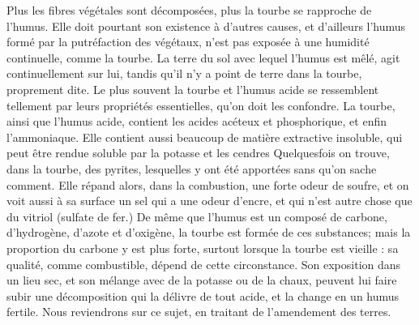Plus les fibres végétales sont décomposées, plus la tourbe se rapproche de l'humus. Elle doit pourtant son existence à d'autres causes,\setcounter{page}{75} et d'ailleurs l'humus formé par la putréfaction des végétaux, n'est pas exposée à une humidité continuelle, comme la tourbe. La terre du sol avec lequel l'humus est mêlé, agit continuellement sur lui, tandis qu'il n'y a point de terre dans la tourbe, proprement dite. Le plus souvent la tourbe et l'humus acide se ressemblent tellement par leurs propriétés essentielles, qu'on doit les confondre.
La tourbe, ainsi que l'humus acide, contient les acides acéteux et phosphorique, et enfin l'ammoniaque. Elle contient aussi beaucoup de matière extractive insoluble, qui peut être rendue soluble par la potasse et les cendres Quelquesfois on trouve, dans la tourbe, des pyrites, lesquelles y ont été apportées sans qu'on sache comment. Elle répand alors, dans la combustion, une forte odeur de soufre, et on voit aussi à sa surface un sel qui a une odeur d'encre, et qui n'est autre chose que du vitriol (sulfate de fer.)
De même que l'humus est un composé de carbone, d'hydrogène, d'azote et d'oxigène, la tourbe est formée de ces substances; mais la proportion du carbone y est plus forte, surtout lorsque la tourbe est vieille : sa qualité,\setcounter{page}{76} comme combustible, dépend de cette circonstance. Son exposition dans un lieu sec, et son mélange avec de la potasse ou de la chaux, peuvent lui faire subir une décomposition qui la délivre de tout acide, et la change en un humus fertile. Nous reviendrons sur ce sujet, en traitant de l’amendement des terres.